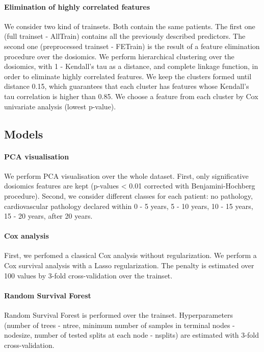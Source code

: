 \documentclass{article}
\begin{document}
\paragraph{Elimination of highly correlated features}

We consider two kind of trainsets. Both contain the same patients. The first one (full trainset - AllTrain) contains all the previously described predictors. 
The second one (preprocessed trainset - FETrain) is the result of a feature elimination procedure over the dosiomics. We perform hierarchical clustering over the dosiomics, with 1 - Kendall's tau as a distance, and complete linkage function, in order to eliminate highly correlated features. We keep the clusters formed until distance 0.15, which guarantees that each cluster has features whose Kendall's tau correlation is higher than 0.85. We choose a feature from each cluster by Cox univariate analysis (lowest p-value).

\subsection{Models}

\paragraph{PCA visualisation}

We perform PCA visualisation over the whole dataset. First, only significative dosiomics features are kept (p-values < 0.01 corrected with Benjamini-Hochberg procedure). Second, we consider different classes for each patient: no pathology, cardiovascular pathology declared within 0 - 5 years, 5 - 10 years, 10 - 15 years, 15 - 20 years, after 20 years.

\paragraph{Cox analysis}

First, we perfomed a classical Cox analysis without regularization. We perform a Cox survival analysis with a Lasso regularization. The penalty is estimated over 100 values by 3-fold cross-validation over the trainset.

\paragraph{Random Survival Forest}

Random Survival Forest is performed over the trainset. Hyperparameters (number of trees - ntree, minimum number of samples in terminal nodes - nodesize, number of tested splits at each node - nsplits) are estimated with 3-fold cross-validation.
\end{document}

